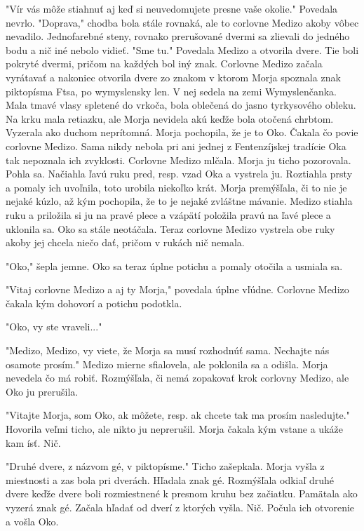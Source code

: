 \documentclass{book}
\begin{document}
"$ $Vír vás môže stiahnuť aj keď si neuvedomujete presne vaše okolie."$ $ Povedala nevrlo. "$ $Doprava,"$ $ chodba bola stále rovnaká, ale to corlovne Medizo akoby vôbec nevadilo. Jednofarebné steny, rovnako prerušované dvermi sa zlievali do jedného bodu a nič iné nebolo vidieť. "$ $Sme tu."$ $ Povedala Medizo a otvorila dvere. Tie boli pokryté dvermi, pričom na každých bol iný znak. Corlovne Medizo začala vyrátavať a nakoniec otvorila dvere zo znakom v ktorom Morja spoznala znak piktopísma Ftsa, po wymyslensky len. V nej sedela na zemi Wymyslenčanka. Mala tmavé vlasy spletené do vrkoča, bola oblečená do jasno tyrkysového obleku. Na krku mala retiazku, ale Morja nevidela akú keďže bola otočená chrbtom. Vyzerala ako duchom neprítomná. Morja pochopila, že je to Oko. Čakala čo povie corlovne Medizo. Sama nikdy nebola pri ani jednej z Fentenzíjskej tradície Oka tak nepoznala ich zvyklosti. Corlovne Medizo mlčala. Morja ju ticho pozorovala. Pohla sa. Načiahla ľavú ruku pred, resp. vzad Oka a vystrela ju. Roztiahla prsty a pomaly ich uvoľnila, toto urobila niekoľko krát. Morja premýšľala, či to nie je nejaké kúzlo, až kým pochopila, že to je nejaké zvláštne mávanie. Medizo stiahla ruku a priložila si ju na pravé plece a vzápätí položila pravú na ľavé plece a uklonila sa. Oko sa stále neotáčala. Teraz corlovne Medizo vystrela obe ruky akoby jej chcela niečo dať, pričom v rukách nič nemala.

"$ $Oko,"$ $ šepla jemne. Oko sa teraz úplne potichu a pomaly otočila a usmiala sa.

"$ $Vitaj corlovne Medizo a aj ty Morja,"$ $ povedala úplne vľúdne. Corlovne Medizo čakala kým dohovorí a potichu podotkla.

"$ $Oko, vy ste vraveli..."

"$ $Medizo, Medizo, vy viete, že Morja sa musí rozhodnúť sama. Nechajte nás osamote prosím."$ $ Medizo mierne sfialovela, ale poklonila sa a odišla. Morja nevedela čo má robiť. Rozmýšľala, či nemá zopakovať krok corlovny Medizo, ale Oko ju prerušila.

"$ $Vitajte Morja, som Oko, ak môžete, resp. ak chcete tak ma prosím nasledujte."$ $ Hovorila veľmi ticho, ale nikto ju neprerušil. Morja čakala kým vstane a ukáže kam ísť. Nič.

"$ $Druhé dvere, z názvom gé, v piktopísme."$ $ Ticho zašepkala. Morja vyšla z miestnosti a zas bola pri dverách. Hľadala znak gé. Rozmýšľala odkiaľ druhé dvere keďže dvere boli rozmiestnené k presnom kruhu bez začiatku. Pamätala ako vyzerá znak gé. Začala hľadať od dverí z ktorých vyšla. Nič. Počula ich otvorenie a vošla Oko.
\end{document}
